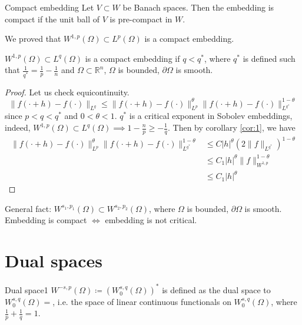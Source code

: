 \documentclass{report}
\begin{document}
\begin{definition}{Compact embedding}{}
        Let \(V \subset W\) be Banach spaces. Then the embedding is compact if the unit ball of \(V\) is pre-compact in \(W\).
\end{definition}

\begin{note}
    We proved that \(W^{1, p}(\Omega) \subset L^{p}(\Omega)\) is a compact embedding.
\end{note}

\cor{}
{
    \(W^{1, p}(\Omega) \subset L^{q}(\Omega)\) is a compact embedding if \(q < q^{*}\), where \(q^{*}\) is defined such that \(\frac{1}{q^{*}} = \frac{1}{p} - \frac{1}{n}\) and \(\Omega \subset  \mathbb{R}^{n}\), \(\Omega\) is bounded, \(\partial \Omega\) is smooth.
}

\begin{proof}
    Let us check equicontinuity. 
    \[
        \|f(\cdot + h) - f(\cdot)\|_{L^{q}} \leq \|f(\cdot + h) - f(\cdot)\|_{L^{p}}^{\theta} \|f(\cdot + h) - f(\cdot)\|_{L^{q^{*}}}^{1-\theta} 
    \]
    since \(p < q < q^{*}\) and \(0 < \theta < 1\). \(q^{*}\) is a critical exponent in Sobolev embeddings, indeed, \(W^{1, p}(\Omega) \subset L^{q}(\Omega) \implies 1-\frac{n}{p} \geq -\frac{1}{q}\). Then by corollary \ref{cor:1}, we have
    \begin{align*}
        \|f(\cdot + h) - f(\cdot)\|_{L^{p}}^{\theta} \|f(\cdot + h) - f(\cdot)\|_{L^{q^{*}}}^{1-\theta} &\leq C \vert h \vert ^{\theta}(2\|f\|_{L^{q^{*}}})^{1-\theta} \\
        &\leq C_1 \vert h \vert ^{\theta} \|f\|_{W^{1, p}}^{1-\theta} \\
        &\leq C_1 \vert h \vert ^{\theta}
    \end{align*}
\end{proof}

General fact: \(W^{s_1, p_1}(\Omega) \subset W^{s_2, p_2}(\Omega)\), where \(\Omega\) is bounded, \(\partial \Omega\) is smooth. Embedding is compact \(\iff\) embedding is not critical.

\section{Dual spaces}
\begin{definition}{Dual space}{1}
    \(W^{-s, p}(\Omega) \coloneqq \left(W^{s, q}_{0}(\Omega)\right)^{*}\) is defined as the dual space to \(W^{s, q}_{0}(\Omega) =\), i.e. the space of linear continuous functionals on \(W^{s, q}_{0}(\Omega)\), where \(\frac{1}{p} + \frac{1}{q} = 1\).
\end{definition}
\end{document}

